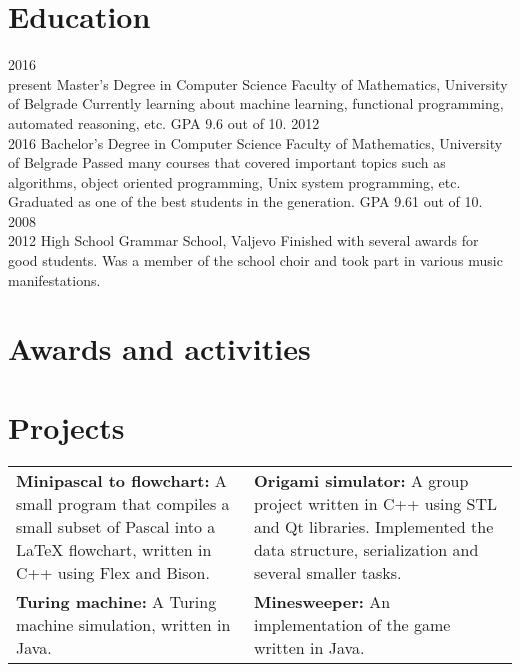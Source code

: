 \documentclass[a4paper]{my_cv}
\begin{document}
\section{Education}
\begin{entrylist}
  \entry
    {2016~\textemdash \\present}
    {Master's Degree in Computer Science}
    {Faculty of Mathematics, University of Belgrade}
    {Currently learning about machine learning, functional programming, automated reasoning, etc. GPA 9.6 out of 10.}
  \entry
    {2012~\textemdash \\2016}
    {Bachelor's Degree in Computer Science}
    {Faculty of Mathematics, University of Belgrade}
    {Passed many courses that covered important topics such as algorithms, object oriented programming, Unix system programming, etc. Graduated as one of the best students in the generation. GPA 9.61 out of 10.}
  \entry
    {2008~\textemdash \\2012}
    {High School}
    {Grammar School, Valjevo}
    {Finished with several awards for good students. Was a member of the school choir and took part in various music manifestations.}
\end{entrylist}

\section{Awards and activities}
\bodyfont
\begin{aplist}
\end{aplist}

\section{Projects}
\setlength{\tabcolsep}{6pt}
\begin{tabularx}{1.07\textwidth}{XX}
\textbf{Minipascal to flowchart:} A small program that compiles a small subset of Pascal into a LaTeX flowchart, written in C++ using Flex and Bison. &
\textbf{Origami simulator:} A group project written in C++ using STL and Qt libraries. Implemented the data structure, serialization and several smaller tasks. \\
\textbf{Turing machine:} A Turing machine simulation, written in Java. &
\textbf{Minesweeper:} An implementation of the game written in Java. \\
\end{tabularx}
~
\end{document}
